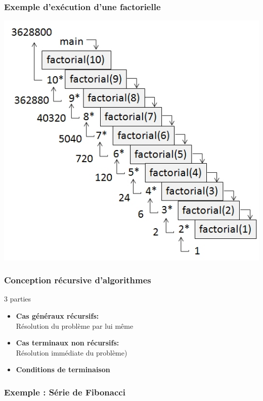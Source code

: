 \documentclass[table,handout,tikz,12pt,svgnames]{beamer}
\begin{document}
\begin{frame}[fragile=singleslide]
	\frametitle{Exemple d'exécution d'une factorielle}
	{\includegraphics[scale=0.50]{../common-images/RecursiveFactorial.jpg}}
\end{frame}

\begin{frame}[fragile=singleslide]
	\frametitle{Conception récursive d'algorithmes}
	\begin{block}{3 parties} %
		\begin{itemize}
			\item \textbf{Cas généraux récursifs:} \\ Résolution du problème par lui même
			\item \textbf{Cas terminaux non récursifs:} \\ Résolution immédiate du problème)
			\item \textbf{Conditions de terminaison} 
		\end{itemize}
	\end{block}
\end{frame}

\begin{frame}[fragile=singleslide]
	\frametitle{Exemple : Série de Fibonacci}
	\begin{verbatim}
	\end{verbatim}
\end{frame}
\end{document}
